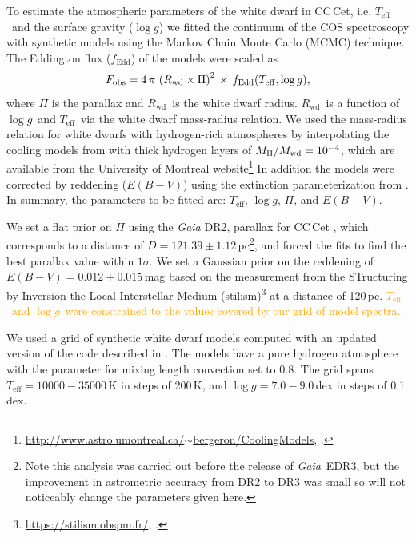 \documentclass[fleqn,usenatbib]{mnras}
\newcommand{\Rwd}{\mbox{$R_{\mathrm{wd}}$}}
\newcommand{\Mwd}{\mbox{$M_{\mathrm{wd}}$}}
\newcommand{\Teff}{\mbox{$T_{\mathrm{eff}}$}}
\newcommand{\logg}{\mbox{$\log g$}}
\newcommand{\bgs}[1]{\textcolor{orange}{#1}}
\begin{document}
To estimate the atmospheric parameters of the white dwarf in CC\,Cet, i.e. \Teff\ and the surface gravity (\logg) we fitted the continuum of the COS spectroscopy with synthetic models using the Markov Chain Monte Carlo (MCMC) technique. The Eddington flux ($f_\text{Edd}$) of the models were scaled as
\begin{equation}
    F_{\rm obs} = 4\,\pi\,\left(\Rwd \times \Pi\right)^{2}\,\times\,f_{\rm Edd}(\Teff, \logg),
    \label{eq:model}
\end{equation}
where $\Pi$ is the parallax and \Rwd\ is the white dwarf radius. \Rwd\ is a function of \logg\ and \Teff\ via the white dwarf mass-radius relation. We used the mass-radius relation for white dwarfs with hydrogen-rich atmospheres by interpolating the cooling models from \citet{fontaineetal01-1} with thick hydrogen layers of $M_{\rm H}/\Mwd=10^{-4}$, which are available from the University of Montreal website\footnote{\href{http://www.astro.umontreal.ca/~bergeron/CoolingModels}{http://www.astro.umontreal.ca/$\sim$bergeron/CoolingModels}, \citet{bergeronetal95-2, holberg+bergeron06-1, tremblayetal11-2,kowalski+saumon06-1}.} 
In addition the models were corrected by reddening ($E(B-V)$) using the extinction parameterization from  \citet{fitzpatrick99-1}. In summary, the parameters to be fitted are: \Teff, \logg, $\Pi$, and $E(B-V)$.

We set a flat prior on $\Pi$ using the \textit{Gaia} DR2, parallax for CC\,Cet \citep[$\Pi=8.2381\pm0.0758$\,mas, \textit{Gaia} source id~=~15207693216816512][]{gaia18-1}, which corresponds to a distance of $D=121.39\pm1.12$\,pc\footnote{Note this analysis was carried out before the release of \textit{Gaia}\, EDR3, but the improvement in astrometric accuracy from DR2 to DR3 was small so will not noticeably change the parameters given here.}, and forced the fits to find the best parallax value within $1\sigma$. We set a Gaussian prior on the reddening of $E(B-V)=0.012 \pm 0.015$\,mag based on the measurement from the STructuring by Inversion the Local Interstellar Medium (stilism)\footnote{\href{https://stilism.obspm.fr/}{https://stilism.obspm.fr/}, \citet{lallementetal14-1, lallementetal18-1, capitanioetal17-1}.} at a distance of 120\,pc. 
\bgs{\Teff\ and \logg\ were constrained to the values covered by our grid of model spectra.}

We used a grid of synthetic white dwarf models computed with
an updated version of the code described in \citep{koester10-1}. The models have a pure hydrogen atmosphere with the parameter for mixing length convection set to 0.8. The grid spans 
$\Teff=10000-35000$\,K in steps of 200\,K, and 
$\logg=7.0-9.0$\,dex in steps of 0.1\,dex.
\end{document}
